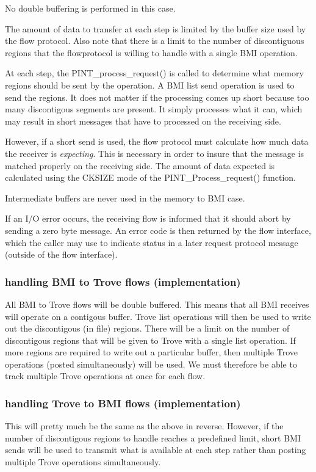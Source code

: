 \documentclass[12pt]{article} %
\begin{document}
No double buffering is performed in this case.  

The amount of data to transfer at each step is limited by the buffer
size used by the flow protocol.  Also note that there is a limit to
the number of discontiguous regions that the flowprotocol is willing to
handle with a single BMI operation.

At each step, the PINT\_process\_request() is called to determine
what memory regions should be sent by the operation.  A BMI list
send operation is used to send the regions.   It does not matter
if the processing comes up short because too many discontigous
segments are present.  It simply processes what it can, which may
result in short messages that have to processed on the receiving
side.

However, if a short send is used, the flow protocol must calculate
how much data the receiver is \emph{expecting}.  This is necessary
in order to insure that the message is matched properly on the
receiving side.  The amount of data expected is calculated using
the CKSIZE mode of the PINT\_Process\_request() function.

Intermediate buffers are never used in the memory to BMI case.

If an I/O error occurs, the receiving flow is informed that it
should abort by sending a zero byte message.  An error code is
then returned by the flow interface, which the caller may use to
indicate status in a later request protocol message (outside of
the flow interface).

\subsubsection{handling BMI to Trove flows (implementation)}

All BMI to Trove flows will be double buffered.  This means that
all BMI receives will operate on a contigous buffer.  Trove list
operations will then be used to write out the discontigous (in
file) regions.  There will be a limit on the number of
discontigous regions that will be given to Trove with a single
list operation.  If more regions are required to write out a
particular buffer, then multiple Trove operations (posted
simultaneously) will be used.  We must therefore be able to track
multiple Trove operations at once for each flow.

\subsubsection{handling Trove to BMI flows (implementation)}  

This will pretty much be the same as the above in reverse.
However, if the number of discontigous regions to handle reaches a
predefined limit, short BMI sends will be used to transmit what is
available at each step rather than posting multiple Trove
operations simultaneously.
\end{document}
